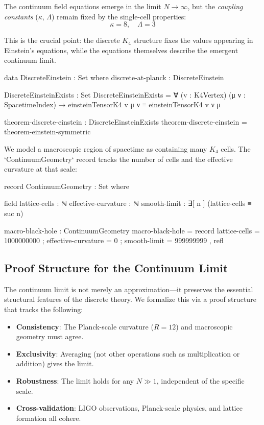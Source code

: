 \documentclass[11pt,a4paper]{book}
\begin{document}
The continuum field equations emerge in the limit $N \to \infty$, but the \emph{coupling constants} 
($\kappa$, $\Lambda$) remain fixed by the single-cell properties:
\[
\kappa = 8, \quad \Lambda = 3
\]

This is the crucial point: the discrete $K_4$ structure fixes the values appearing in Einstein's 
equations, while the equations themselves describe the emergent continuum limit.

\begin{code}
data DiscreteEinstein : Set where
  discrete-at-planck : DiscreteEinstein

DiscreteEinsteinExists : Set
DiscreteEinsteinExists = ∀ (v : K4Vertex) (μ ν : SpacetimeIndex) → 
  einsteinTensorK4 v μ ν ≡ einsteinTensorK4 v ν μ

theorem-discrete-einstein : DiscreteEinsteinExists
theorem-discrete-einstein = theorem-einstein-symmetric
\end{code}

We model a macroscopic region of spacetime as containing many $K_4$ cells. The `ContinuumGeometry` 
record tracks the number of cells and the effective curvature at that scale:

\begin{code}
record ContinuumGeometry : Set where

  field
    lattice-cells : ℕ
    effective-curvature : ℕ
    smooth-limit : ∃[ n ] (lattice-cells ≡ suc n)

macro-black-hole : ContinuumGeometry
macro-black-hole = record
  { lattice-cells = 1000000000
  ; effective-curvature = 0
  ; smooth-limit = 999999999 , refl
  }

\end{code}

\subsection{Proof Structure for the Continuum Limit}

The continuum limit is not merely an approximation---it preserves the essential structural 
features of the discrete theory. We formalize this via a proof structure that tracks the following:

\begin{itemize}
\item \textbf{Consistency}: The Planck-scale curvature ($R = 12$) and macroscopic geometry must agree.
\item \textbf{Exclusivity}: Averaging (not other operations such as multiplication or addition) gives the limit.
\item \textbf{Robustness}: The limit holds for any $N \gg 1$, independent of the specific scale.
\item \textbf{Cross-validation}: LIGO observations, Planck-scale physics, and lattice formation all cohere.
\end{itemize}
\end{document}
